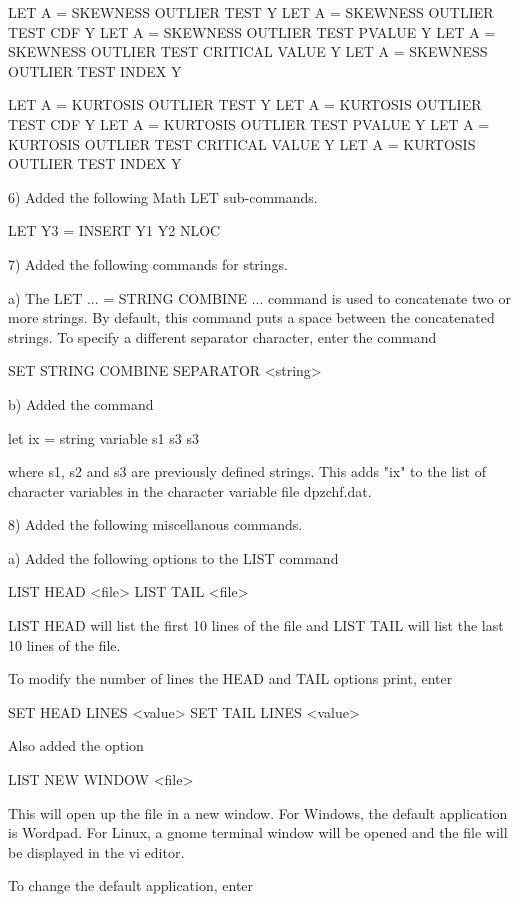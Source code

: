       LET A = SKEWNESS OUTLIER TEST Y
      LET A = SKEWNESS OUTLIER TEST CDF Y
      LET A = SKEWNESS OUTLIER TEST PVALUE Y
      LET A = SKEWNESS OUTLIER TEST CRITICAL VALUE Y
      LET A = SKEWNESS OUTLIER TEST INDEX Y

      LET A = KURTOSIS OUTLIER TEST Y
      LET A = KURTOSIS OUTLIER TEST CDF Y
      LET A = KURTOSIS OUTLIER TEST PVALUE Y
      LET A = KURTOSIS OUTLIER TEST CRITICAL VALUE Y
      LET A = KURTOSIS OUTLIER TEST INDEX Y

 6) Added the following Math LET sub-commands.

      LET Y3 = INSERT Y1 Y2 NLOC

 7) Added the following commands for strings.

    a) The LET ... = STRING COMBINE ... command is used to concatenate 
       two or more strings.  By default, this command puts a space
       between the concatenated strings.  To specify a different 
       separator character, enter the command

           SET STRING COMBINE SEPARATOR <string>

    b) Added the command

          let ix = string variable s1 s3 s3

       where s1, s2 and s3 are previously defined strings.  This adds
       "ix" to the list of character variables in the character variable
       file dpzchf.dat.

 8) Added the following miscellanous commands.

    a) Added the following options to the LIST command

          LIST HEAD <file>
          LIST TAIL <file>

       LIST HEAD will list the first 10 lines of the file and LIST TAIL
       will list the last 10 lines of the file.

       To modify the number of lines the HEAD and TAIL options print,
       enter

          SET HEAD LINES <value>
          SET TAIL LINES <value>

       Also added the option

          LIST NEW WINDOW <file>

       This will open up the file in a new window.  For Windows, the
       default application is Wordpad.  For Linux, a gnome terminal window
       will be opened and the file will be displayed in the vi editor.

       To change the default application, enter

